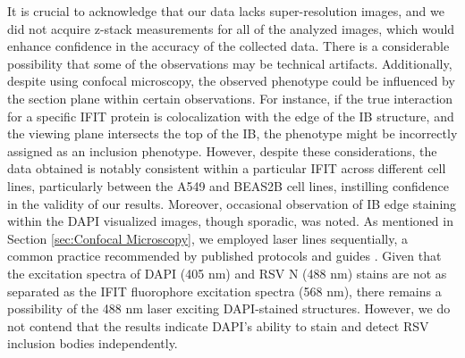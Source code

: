 It is crucial to acknowledge that our data lacks super-resolution images, and we did not acquire z-stack measurements for all of the analyzed images, which would enhance confidence in the accuracy of the collected data. There is a considerable possibility that some of the observations may be technical artifacts. Additionally, despite using confocal microscopy, the observed phenotype could be influenced by the section plane within certain observations. For instance, if the true interaction for a specific IFIT protein is colocalization with the edge of the IB structure, and the viewing plane intersects the top of the IB, the phenotype might be incorrectly assigned as an inclusion phenotype. However, despite these considerations, the data obtained is notably consistent within a particular IFIT across different cell lines, particularly between the A549 and BEAS2B cell lines, instilling confidence in the validity of our results. Moreover, occasional observation of IB edge staining within the DAPI visualized images, though sporadic, was noted. As mentioned in Section \ref{sec:Confocal Microscopy}, we employed laser lines sequentially, a common practice recommended by published protocols and guides \cite{Jonkman2020Tutorial:Microscopy}. Given that the excitation spectra of DAPI (405 nm) and RSV N (488 nm) stains are not as separated as the IFIT fluorophore excitation spectra (568 nm), there remains a possibility of the 488 nm laser exciting DAPI-stained structures. However, we do not contend that the results indicate DAPI's ability to stain and detect RSV inclusion bodies independently.

